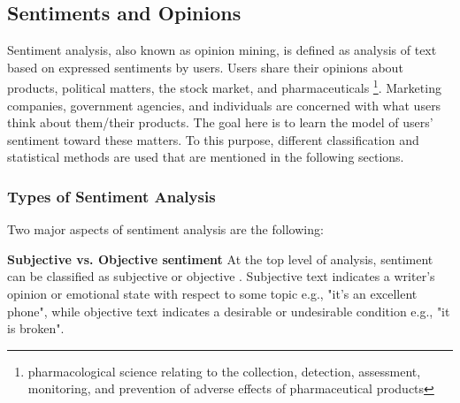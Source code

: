 \documentclass[11pt,a4paper]{article}
\begin{document}

\subsection{Sentiments and Opinions}
\label{sentiment_section}

Sentiment analysis, also known as opinion mining, is defined as analysis of text based on expressed sentiments by users. Users share their opinions about products, political matters, the stock market, and pharmaceuticals \footnote{pharmacological science relating to the collection, detection, assessment, monitoring, and prevention of adverse effects of pharmaceutical products}. Marketing companies, government agencies, and individuals are concerned with what users think about them/their products. The goal here is to learn the model of users' sentiment toward these matters. To this purpose, different classification and statistical methods are used that are mentioned in the following sections.


\subsubsection{Types of Sentiment Analysis}

Two major aspects of sentiment analysis are the following:

\textbf{Subjective vs. Objective sentiment} At the top level of analysis, sentiment can be classified as subjective or objective \cite{liu09}. Subjective text indicates a writer's opinion or emotional state with respect to some topic e.g., "it's an excellent phone", while objective text indicates a desirable or undesirable condition e.g., "it is broken". %
\end{document}
